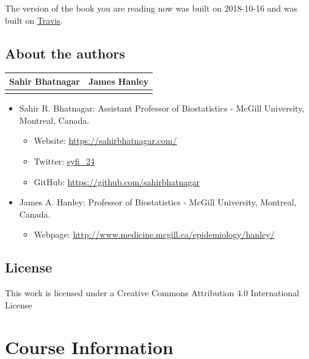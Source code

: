 \documentclass[]{book}
\providecommand{\tightlist}{%
  \setlength{\itemsep}{0pt}\setlength{\parskip}{0pt}}
\providecommand{\tightlist}{%
  \setlength{\itemsep}{0pt}\setlength{\parskip}{0pt}}
\theoremstyle{definition}
\theoremstyle{definition}
\theoremstyle{definition}
\theoremstyle{remark}
\begin{document}
The version of the book you are reading now was built on 2018-10-16 and
was built on
\href{https://travis-ci.org/sahirbhatnagar/MATH697}{Travis}.

\section{About the authors}\label{about-the-authors}

\begin{longtable}[]{@{}cc@{}}
\toprule
Sahir Bhatnagar & James Hanley\tabularnewline
\midrule
\endhead
&\tabularnewline
\bottomrule
\end{longtable}

\begin{itemize}
\tightlist
\item
  Sahir R. Bhatnagar: Assistant Professor of Biostatistics - McGill
  University, Montreal, Canada.

  \begin{itemize}
  \tightlist
  \item
    Website: \url{https://sahirbhatnagar.com/}\\
  \item
    Twitter: \href{https://twitter.com/syfi_24}{syfi\_24}\\
  \item
    GitHub: \url{https://github.com/sahirbhatnagar}\\
  \end{itemize}
\item
  James A. Hanley: Professor of Biostatistics - McGill University,
  Montreal, Canada.

  \begin{itemize}
  \tightlist
  \item
    Webpage: \url{http://www.medicine.mcgill.ca/epidemiology/hanley/}
  \end{itemize}
\end{itemize}

\section{License}\label{license}

This work is licensed under a Creative Commons Attribution 4.0
International License

\chapter{Course Information}\label{course-information}
\end{document}

